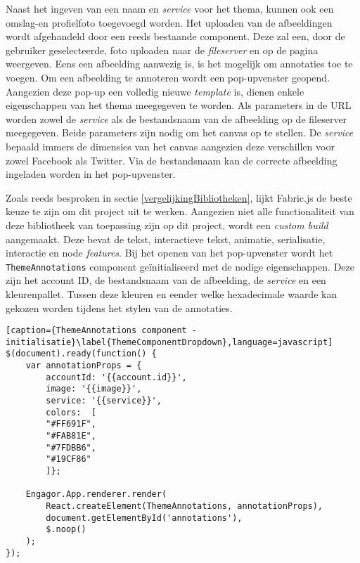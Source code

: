Naast het ingeven van een naam en \textit{service} voor het thema, kunnen ook een omslag-en profielfoto toegevoegd worden. Het uploaden van de afbeeldingen wordt afgehandeld door een reeds bestaande component. Deze zal een, door de gebruiker geselecteerde, foto uploaden naar de \textit{fileserver} en op de pagina weergeven. Eens een afbeelding aanwezig is, is het mogelijk om annotaties toe te voegen. Om een afbeelding te annoteren wordt een pop-upvenster geopend. Aangezien deze pop-up een volledig nieuwe \textit{template} is, dienen enkele eigenschappen van het thema meegegeven te worden. Als parameters in de URL worden zowel de \textit{service} als de bestandsnaam van de afbeelding op de fileserver meegegeven. Beide parameters zijn nodig om het canvas op te stellen. De \textit{service} bepaald immers de dimensies van het canvas aangezien deze verschillen voor zowel Facebook als Twitter. Via de bestandsnaam kan de correcte afbeelding ingeladen worden in het pop-upvenster.

Zoals reeds besproken in sectie \ref{vergelijkingBibliotheken}, lijkt Fabric.js de beste keuze te zijn om dit project uit te werken. Aangezien niet alle functionaliteit van deze bibliotheek van toepassing zijn op dit project, wordt een \textit{custom build} aangemaakt. Deze bevat de tekst, interactieve tekst, animatie, serialisatie, interactie en node \textit{features}. Bij het openen van het pop-upvenster wordt het \lstinline{ThemeAnnotations} component ge\"{i}nitialiseerd met de nodige eigenschappen. Deze zijn het account ID, de bestandsnaam van de afbeelding, de \textit{service} en een kleurenpallet. Tussen deze kleuren en eender welke hexadecimale waarde kan gekozen worden tijdens het stylen van de annotaties.

\begin{lstlisting}[caption={ThemeAnnotations component - initialisatie}\label{ThemeComponentDropdown},language=javascript]
$(document).ready(function() {
	var annotationProps = {
		accountId: '{{account.id}}',
		image: '{{image}}',
		service: '{{service}}',
		colors:  [
		"#FF691F",
		"#FAB81E",
		"#7FDBB6",
		"#19CF86"
		]};
		
	Engagor.App.renderer.render(
		React.createElement(ThemeAnnotations, annotationProps),
		document.getElementById('annotations'),
		$.noop()
	);
});
\end{lstlisting}

